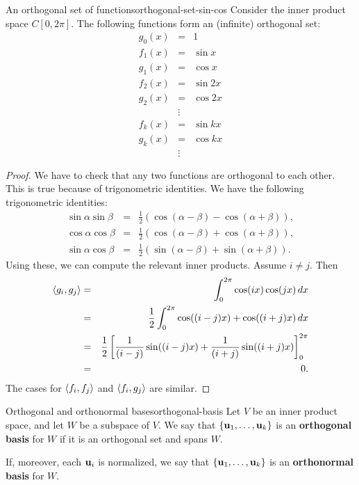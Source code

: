 \begin{example}{An orthogonal set of functions}{orthogonal-set-sin-cos}
  Consider the inner product space $C[0,2\pi]$. The following
  functions form an (infinite) orthogonal set:
  \begin{eqnarray*}
    g_0(x) &=& 1 \\
    f_1(x) &=& \sin x \\
    g_1(x) &=& \cos x \\
    f_2(x) &=& \sin 2x \\
    g_2(x) &=& \cos 2x \\
    &\vdots& \\
    f_k(x) &=& \sin kx \\
    g_k(x) &=& \cos kx \\
    &\vdots&
  \end{eqnarray*}
\end{example}

\begin{proof}
  We have to check that any two functions are orthogonal to each
  other. This is true because of trigonometric identities. We have the
  following trigonometric identities:
  \begin{eqnarray*}
    \sin\alpha\sin\beta &=& \frac{1}{2}(\cos(\alpha-\beta) - \cos(\alpha+\beta)), \\
    \cos\alpha\cos\beta &=& \frac{1}{2}(\cos(\alpha-\beta) + \cos(\alpha+\beta)), \\
    \sin\alpha\cos\beta &=& \frac{1}{2}(\sin(\alpha-\beta) + \sin(\alpha+\beta)).
  \end{eqnarray*}
  Using these, we can compute the relevant inner products. Assume $i\neq j$. Then
  \begin{eqnarray*}
    \langle g_i,g_j\rangle
    &=& \int_{0}^{2\pi} \cos(ix)\cos(jx)\,dx \\
    &=& \frac{1}{2}\int_{0}^{2\pi} \cos((i-j)x) + \cos((i+j)x)\,dx \\
    &=& \frac{1}{2}\left[\frac{1}{(i-j)} \sin((i-j)x) + \frac{1}{(i+j)}
      \sin((i+j)x)\right]_{0}^{2\pi} \\
    &=& 0.
  \end{eqnarray*}
  The cases for $\langle f_i,f_j\rangle$ and $\langle f_i,g_j\rangle$ are similar.
\end{proof}

\begin{definition}{Orthogonal and orthonormal bases}{orthogonal-basis}
  Let $V$ be an inner product space, and let $W$ be a subspace of
  $V$. We say that $\set{\vect{u}_1,\ldots,\vect{u}_k}$ is an
  \textbf{orthogonal basis}%
   for $W$ if it is an orthogonal set and
  spans $W$.
  \smallskip\smallskip

  If, moreover, each $\vect{u}_i$ is normalized, we say that
  $\set{\vect{u}_1,\ldots,\vect{u}_k}$ is an \textbf{orthonormal
    basis}%
   for $W$.
\end{definition}

